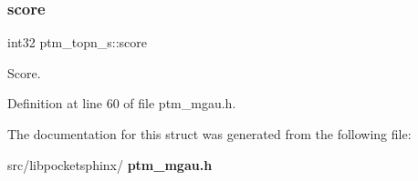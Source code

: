 \subsubsection{score}
{\footnotesize\ttfamily int32 ptm\+\_\+topn\+\_\+s\+::score}



Score. 



Definition at line 60 of file ptm\+\_\+mgau.\+h.



The documentation for this struct was generated from the following file\+:\begin{DoxyCompactItemize}
\item 
src/libpocketsphinx/\textbf{ ptm\+\_\+mgau.\+h}\end{DoxyCompactItemize}
